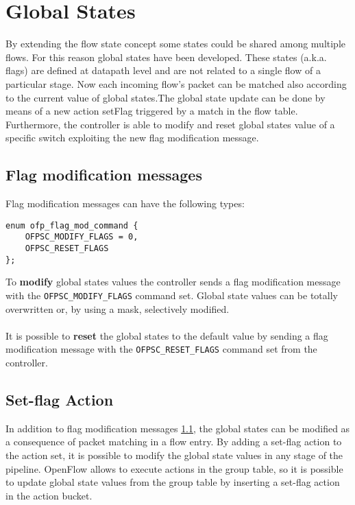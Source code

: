 
\chapter{Global States}
\label{chap:global_states}
By extending the flow state concept some states could be shared among multiple flows. For this reason global states have been developed. These states (a.k.a. flags) are defined at datapath level and are not related to a single flow of a particular stage. Now each incoming flow’s packet can be matched also according to the current value of global states.The global state update can be done by means of a new action setFlag triggered by a match in the flow table. Furthermore, the controller is able to modify and reset global states value of a specific switch exploiting the new flag modification message.
\section{Flag modification messages}
\label{sec:flag_mod_msg}

Flag modification messages can have the following types:
\scriptsize\begin{verbatim}
enum ofp_flag_mod_command { 
    OFPSC_MODIFY_FLAGS = 0,
    OFPSC_RESET_FLAGS
};
\end{verbatim}\normalsize
\noindent
To \textbf{modify} global states values the controller sends a flag modification message with the \texttt{OFPSC\_MODIFY\_FLAGS} command set. Global state values can be totally overwritten or, by using a mask, selectively modified.
\\\\It is possible to \textbf{reset} the global states to the default value by sending a flag modification message with the \texttt{OFPSC\_RESET\_FLAGS} command set from the controller.

\section{Set-flag Action}
\label{sec:act_set_flag}
In addition to flag modification messages \ref{sec:flag_mod_msg}, the global states can be modified as a consequence of packet matching in a flow entry. By adding a set-flag action to the action set, it is possible to modify the global state values in any stage of the pipeline.
OpenFlow allows to execute actions in the group table, so it is possible to update global state values from the group table by inserting a set-flag action in the action bucket.